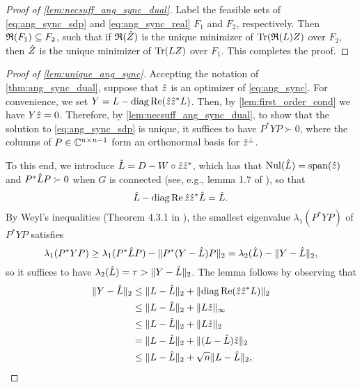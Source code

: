 \begin{proof}[Proof of \cref{lem:necsuff_ang_sync_dual}]
  Label the feasible sets of \eqref{eq:ang_sync_sdp} and \eqref{eq:ang_sync_real} $F_1$ and $F_2$, respectively.  Then $\mathfrak{R}(F_1) \subseteq F_2$, such that if $\mathfrak{R}(\hat{Z})$ is the unique minimizer of $\operatorname{Tr}(\mathfrak{R}(L) Z)$ over $F_2$, then $\hat{Z}$ is the unique minimizer of $\operatorname{Tr}(L Z)$ over $F_1$.  This completes the proof.
\end{proof}

\begin{proof}[Proof of \cref{lem:unique_ang_sync}]
  Accepting the notation of \cref{thm:ang_sync_dual}, suppose that $\hat{z}$ is an optimizer of \eqref{eq:ang_sync}.  For convenience, we set $Y = L - \operatorname{diag} \operatorname{Re} (\hat{z} \hat{z}^* L)$.  Then, by \cref{lem:first_order_cond} we have $Y \hat{z} = 0$.  Therefore, by \cref{lem:necsuff_ang_sync_dual}, to show that the solution to \eqref{eq:ang_sync_sdp} is unique, it suffices to have $P^* Y P \succ 0$, where the columns of $P \in \mathbb{C}^{n \times n - 1}$ form an orthonormal basis for $\hat{z}^\perp$.

  To this end, we introduce $\hat{L} = D - W \circ \hat{z} \hat{z}^*$, which has that $\operatorname{Nul}(\hat{L}) = \operatorname{span}(\hat{z})$ and $P^* \hat{L} P \succ 0$ when $G$ is connected (see, e.g., lemma 1.7 of \cite{chungspectral}), so that \[\hat{L} - \operatorname{diag} \operatorname{Re} \hat{z} \hat{z}^* \hat{L} = \hat{L}.\]  By Weyl's inequalities (Theorem 4.3.1 in \cite{horn2012matrix}), the smallest eigenvalue $\lambda_1(P^* Y P)$ of $P^* Y P$ satisfies \[\lambda_1(P^* Y P) \ge \lambda_1(P^* \hat{L} P) - \lVert P^* (Y - \hat{L}) P\rVert_2 = \lambda_2(\hat{L}) - \lVert Y - \hat{L}\rVert_2,\] so it suffices to have $\lambda_2(\hat{L}) = \tau > \lVert Y - \hat{L}\rVert_2$.  The lemma follows by observing that
  \begin{align*}
    \lVert Y - \hat{L}\rVert_2 &\le \lVert L - \hat{L}\rVert_2 + \lVert \operatorname{diag}\operatorname{Re}(\hat{z} \hat{z}^* L)\rVert_2 \\
    &\le \lVert L - \hat{L}\rVert_2 + \lVert L \hat{z}\rVert_\infty \\
    &\le \lVert L - \hat{L}\rVert_2 + \lVert L \hat{z}\rVert_2 \\
    &=   \lVert L - \hat{L}\rVert_2 + \lVert (L - \hat{L}) \hat{z}\rVert_2 \\
    &\le \lVert L - \hat{L}\rVert_2 + \sqrt{n} \lVert L - \hat{L}\rVert_2, \\
  \end{align*}
\end{proof}

